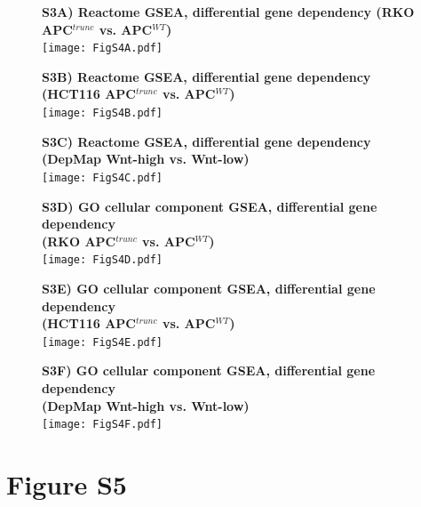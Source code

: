 \documentclass[11pt,a4paper,titlepage]{article}
\begin{document}
\begin{figure}[h!]
\textbf{S3A) Reactome GSEA, differential gene dependency (RKO APC$^{trunc}$ vs. APC$^{WT}$)}\\

\smallskip
\texttt{[image: FigS4A.pdf]} 
\end{figure}

\begin{figure}[h!]
\textbf{S3B) Reactome GSEA, differential gene dependency (HCT116 APC$^{trunc}$ vs. APC$^{WT}$)}\\

\smallskip
\texttt{[image: FigS4B.pdf]} 
\end{figure}

\begin{figure}[h!]
\textbf{S3C) Reactome GSEA, differential gene dependency (DepMap Wnt-high vs. Wnt-low)}\\

\smallskip
\texttt{[image: FigS4C.pdf]} 
\end{figure}

\begin{figure}[h!]
\textbf{S3D) GO cellular component GSEA, differential gene dependency\\(RKO APC$^{trunc}$ vs. APC$^{WT}$)}\\

\smallskip
\texttt{[image: FigS4D.pdf]} 
\end{figure}

\begin{figure}[h!]
\textbf{S3E) GO cellular component GSEA, differential gene dependency\\(HCT116 APC$^{trunc}$ vs. APC$^{WT}$)}\\

\smallskip
\texttt{[image: FigS4E.pdf]} 
\end{figure}

\begin{figure}[h!]
\textbf{S3F) GO cellular component GSEA, differential gene dependency\\(DepMap Wnt-high vs. Wnt-low)}\\

\smallskip
\texttt{[image: FigS4F.pdf]} 
\end{figure}


\clearpage

\section*{Figure S5}
\end{document}
